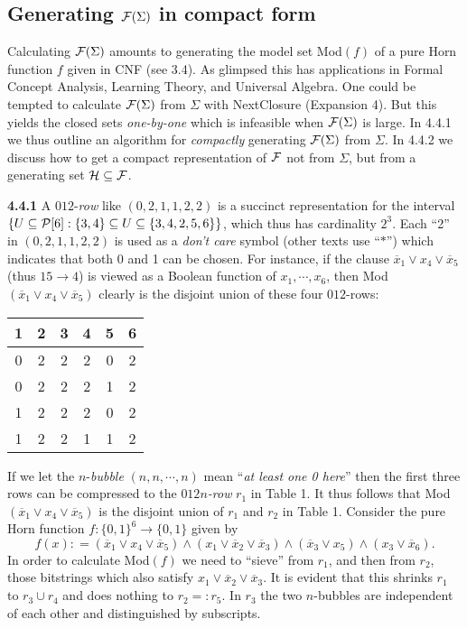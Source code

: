 \documentclass[11pt]{article}
\newcommand{\ol}{\overline}
\newcommand{\ra}{\rightarrow}
\begin{document}
\subsection{Generating ${\cal F}(\Sigma)$ in compact form}

Calculating ${\cal F}(\Sigma)$ amounts to generating the model set Mod$(f)$ of a pure Horn function $f$ given in CNF (see 3.4). As glimpsed this has applications in Formal Concept Analysis, Learning Theory, and Universal Algebra. One could be tempted to calculate ${\cal F}(\Sigma)$ from $\Sigma$ with NextClosure (Expansion 4). But this yields the closed sets {\it one-by-one} which is infeasible when ${\cal F}(\Sigma)$ is large.
 In 4.4.1 we thus outline an algorithm for {\it compactly} generating ${\cal F}(\Sigma)$ from $\Sigma$. In 4.4.2 we discuss how to get a compact representation of ${\cal F}$ not from $\Sigma$, but from a generating set ${\cal H} \subseteq {\cal F}$.

{\bf 4.4.1} A $012$-{\it row} like $(0,2,1,1,2,2)$ is a succinct representation for the interval $\{U \subseteq {\cal P}[6]: \{3,4\} \subseteq U \subseteq \{3,4,2,5,6\}\}$, which thus has cardinality $2^3$. Each ``2'' in $(0,2,1,1,2,2)$ is used as a {\it don't care} symbol (other texts use ``$\ast$'') which indicates that both 0 and 1 can be chosen. For instance, if the clause $\ol{x}_1 \vee x_4 \vee \ol{x}_5$ (thus $15 \ra 4$) is viewed as a Boolean function of $x_1, \cdots, x_6$, then Mod$(\ol{x}_1 \vee x_4 \vee \ol{x}_5)$ clearly is the disjoint union of these four $012$-rows:

\begin{tabular}{|c|c|c|c|c|c|}
1 & 2 & 3& 4 & 5 & 6\\ \hline \hline
0 & 2 & 2 & 2& 0 & 2 \\ \hline
0 & 2 & 2 & 2 & 1 & 2 \\ \hline
1 & 2 &  2& 2& 0 & 2\\ \hline
1 & 2 & 2 & 1 & 1& 2 \\ \hline \end{tabular}

If we let the  $n$-{\it bubble} $(n, n, \cdots, n)$ mean ``{\it at least one 0 here}'' then the first three rows can be compressed to the $012n${\it -row} $r_1$ in Table 1. It thus follows that Mod$(\ol{x}_1 \vee x_4 \vee \ol{x}_5)$ is the disjoint union of $r_1$ and $r_2$ in Table 1. Consider the pure Horn function $f: \{0,1\}^6 \ra \{0,1\}$ given by
$$f(x) : = (\ol{x}_1 \vee x_4 \vee \ol{x}_5) \wedge (x_1 \vee \ol{x}_2 \vee \ol{x}_3) \wedge (\ol{x}_3 \vee x_5) \wedge (x_3 \vee \ol{x}_6).$$
In order to calculate Mod$(f)$ we
 need to ``sieve'' from $r_1$, and then from $r_2$, those bitstrings which also satisfy $x_1 \vee \ol{x}_2 \vee \ol{x}_3$. It is evident that this shrinks $r_1$ to $r_3 \cup r_4$ and does nothing to $r_2 =: r_5$.  In $r_3$ the two $n$-bubbles are independent of each other and distinguished by subscripts.
\end{document}
